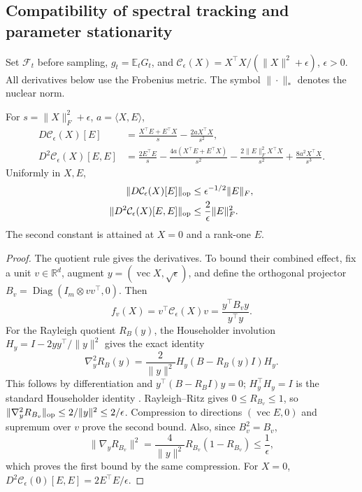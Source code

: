 \subsection{Compatibility of spectral tracking and parameter stationarity}
\label{app:deep-coupling}
Set $\mathcal F_t$ before sampling, $g_t=\mathbb E_tG_t$, and
$\mathcal C_\epsilon(X)=X^\top X/(\|X\|^2+\epsilon)$, $\epsilon>0$.
All derivatives below use the Frobenius metric.
The symbol $\|\cdot\|_*$ denotes the nuclear norm.

\begin{lemma}
\label{lem:covariance-second-differential}
For $s=\|X\|_F^2+\epsilon$, $a=\langle X,E\rangle$,
\begin{align}
 D\mathcal C_\epsilon(X)[E]
 &=\frac{X^\top E+E^\top X}{s}-\frac{2aX^\top X}{s^2},\\
 D^2\mathcal C_\epsilon(X)[E,E]
 &=\frac{2E^\top E}{s}-\frac{4a(X^\top E+E^\top X)}{s^2}
   -\frac{2\|E\|_F^2X^\top X}{s^2}
   +\frac{8a^2X^\top X}{s^3}.
\end{align}
Uniformly in $X,E$,
\begin{align}
 \|D\mathcal C_\epsilon(X)[E]\|_{\rm op}
 &\le\epsilon^{-1/2}\|E\|_F,\\
 \|D^2\mathcal C_\epsilon(X)[E,E]\|_{\rm op}
 &\le\frac2\epsilon\|E\|_F^2.
 \label{eq:covariance-second-bound}
\end{align}
The second constant is attained at $X=0$ and a rank-one $E$.
\end{lemma}
\begin{proof}
The quotient rule gives the derivatives. To bound their combined effect,
fix a unit $v\in\mathbb R^d$, augment
$y=(\operatorname{vec}X,\sqrt\epsilon)$, and define the orthogonal projector
$B_v=\operatorname{Diag}(I_m\otimes vv^\top,0)$. Then
\begin{equation}
 f_v(X)=v^\top\mathcal C_\epsilon(X)v
       =\frac{y^\top B_vy}{y^\top y}.
\end{equation}
For the Rayleigh quotient $R_B(y)$, the Householder involution
$H_y=I-2yy^\top/\|y\|^2$ gives the exact identity
\begin{equation}
 \nabla_y^2R_B(y)=\frac2{\|y\|^2}
                   H_y(B-R_B(y)I)H_y.
 \label{eq:Householder-Rayleigh-Hessian}
\end{equation}
This follows by differentiation and $y^\top(B-R_BI)y=0$;
$H_y^\top H_y=I$ is the standard Householder identity
\cite{golub2013matrix}. Rayleigh--Ritz gives $0\le R_{B_v}\le1$, so
$\|\nabla_y^2R_{B_v}\|_{\rm op}\le2/\|y\|^2\le2/\epsilon$.
Compression to directions $(\operatorname{vec}E,0)$ and supremum over $v$
prove the second bound. Also, since $B_v^2=B_v$,
\begin{equation}
 \|\nabla_yR_{B_v}\|^2
 =\frac4{\|y\|^2}R_{B_v}(1-R_{B_v})\le\frac1\epsilon,
\end{equation}
which proves the first bound by the same compression. For $X=0$,
$D^2\mathcal C_\epsilon(0)[E,E]=2E^\top E/\epsilon$.
\end{proof}

